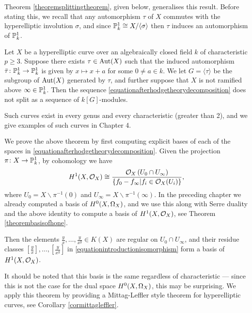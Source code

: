 Theorem \ref{theoremsplittingtheorem}, given below, generalises this result.
Before stating this, we recall that any automorphism $\tau$ of $X$ commutes with the hyperelliptic involution $\sigma$, and since ${\mathbb P}_k^1 \cong X/\langle \sigma \rangle$ then $\tau$ induces an automorphism of ${\mathbb P}_k^1$.
    \begin{unnumthm}
    Let $X$ be a hyperelliptic curve over an algebraically closed field $k$ of characteristic $p \geq 3$.
    Suppose there exists $\tau \in \operatorname{Aut}(X)$ such that the induced automorphism $\bar \tau \colon \mathbb P_k^1 \rightarrow \mathbb P_k^1$ is given by $x \mapsto x+a$ for some $0 \neq a \in k$.
    We let $G = \langle \tau \rangle$ be the subgroup of $\operatorname{Aut}(X)$ generated by $\tau$, and further suppose that $X$ is not ramified above $\infty \in {\mathbb P}_k^1$.
    Then the sequence \eqref{equationafterhodgetheorydecomposition} does not split as a sequence of $k[G]$-modules.
    \end{unnumthm}
Such curves exist in every genus and every characteristic (greater than 2), and we give examples of such curves in Chapter 4.%

We prove the above theorem by first computing explicit bases of each of the spaces in \eqref{equationafterhodgetheorydecomposition}.
Given the projection $\pi \colon X \rightarrow {\mathbb P}_k^1$, by \cech cohomology we have
        \begin{equation}\label{equationintroductionisomorphism}
        H^1(X,\mathcal{O}_X) \cong \frac{{\cal O}_X\left(U_0 \cap U_\infty\right)}{\{ f_0 - f_\infty | f_i \in {\cal O}_X(U_i)\}},
        \end{equation}
where $U_0 = X \backslash \pi^{-1}(0)$ and $U_\infty = X \backslash \pi^{-1}(\infty)$.
In the preceding chapter we already computed a basis of ${H^0(X,\Omega_X)}$, and we use this along with Serre duality and the above identity to compute a basis of $H^1(X,\mathcal{O}_X)$, see Theorem \ref{theorembasisofhone}.
    \begin{unnumthm}
    Then the elements $\frac{y}{x}, \ldots, \frac{y}{x^g} \in K(X)$ are regular on $U_0 \cap U_\infty$, and their residue classes $\left [ \frac{y}{x} \right ],  \ldots, \left [ \frac{y}{x^g} \right]$ in \eqref{equationintroductionisomorphism} form a basis of $H^1(X,\mathcal{O}_X)$.
    \end{unnumthm}
It should be noted that this basis is the same regardless of characteristic --- since this is not the case for the dual space ${H^0(X,\Omega_X)}$, this may be surprising.
We apply this theorem by providing a Mittag-Leffler style theorem for hyperelliptic curves, see Corollary \ref{cormittagleffler}.


